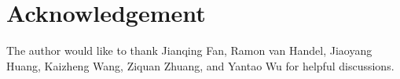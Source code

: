 \documentclass[12pt]{article}%
\theoremstyle{plain}%
\theoremstyle{remark}
\begin{document}
\section*{Acknowledgement}
The author would like to thank Jianqing Fan, Ramon van Handel, Jiaoyang Huang, Kaizheng Wang, Ziquan Zhuang, and Yantao Wu for helpful discussions.





%

\end{document}
